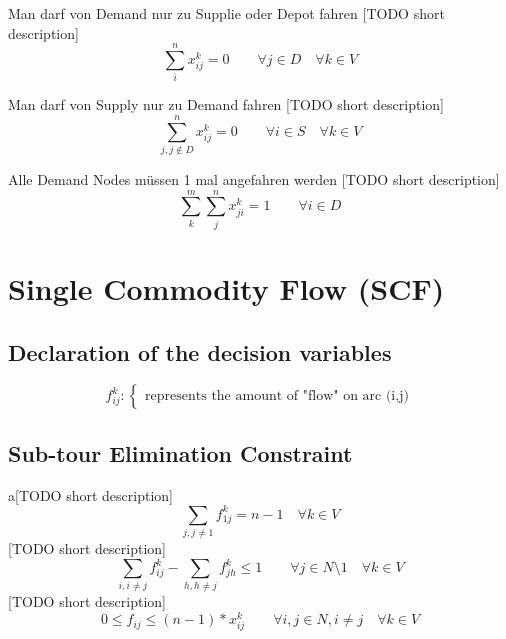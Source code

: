 \documentclass[a4paper]{article}
\begin{document}
Man darf von Demand nur zu Supplie oder Depot fahren [TODO short description]
\begin{equation}
\sum_{i}^n x_{ij}^k = 0		\quad 
\quad		\forall j \in D
\quad		\forall k \in V 
\end{equation}

Man darf von Supply nur zu Demand fahren [TODO short description]
\begin{equation}
\sum_{j,j \not\in D}^n x_{ij}^k = 0		\quad 
\quad		\forall i \in S
\quad		\forall k \in V 
\end{equation}

Alle Demand Nodes müssen 1 mal angefahren werden [TODO short description]
\begin{equation}
\sum_{k}^m \sum_{j}^n x_{ji}^k = 1		\quad 
\quad		\forall i \in D 
\end{equation}


\section*{Single Commodity Flow (SCF)}
\subsection*{Declaration of the decision variables}
\begin{equation*}
f_{ij}^k : 
	\begin{cases}
	\text{represents the amount of "flow" on arc (i,j)}
	\end{cases}
\end{equation*}

\subsection*{Sub-tour Elimination Constraint}
a[TODO short description]
\begin{equation}
\sum_{j, j\neq 1} f_{1j}^k = n - 1
\quad \forall k \in V 
\end{equation}
[TODO short description]
\begin{equation}
\sum_{i, i\neq j} f_{ij}^k - \sum_{h, h\neq j} f_{jh}^k \leq 1 \quad 
\quad \forall j \in N \setminus {1}
\quad \forall k \in V 
\end{equation}
[TODO short description]
\begin{equation}
0 \leq f_{ij} \leq (n - 1) * x_{ij}^k \quad 
\quad \forall i,j \in N, i \neq j
\quad \forall k \in V 
\end{equation}
\end{document}
